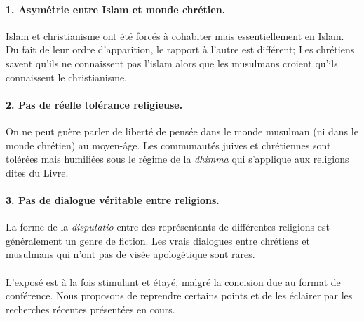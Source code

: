 \paragraph{1. Asymétrie entre Islam et monde chrétien.} Islam et christianisme ont été forcés à cohabiter mais essentiellement en Islam. Du fait de leur ordre d'apparition, le rapport à l'autre est différent; Les chrétiens savent qu'ils ne connaissent pas l'islam alors que les musulmans croient qu'ils connaissent le christianisme. \begin{comment}
    Les chrétiens sont curieux de l'Islam alors que le christianisme est pour l'islam une \textit{vieille histoire}, connue mais dépassée. 
\end{comment}


\paragraph{2. Pas de réelle tolérance religieuse.} On ne peut guère parler de liberté de pensée dans le monde musulman (ni dans le monde chrétien) au moyen-âge.  Les communautés juives et chrétiennes sont tolérées mais humiliées sous le régime de la \textit{dhimma} qui s'applique aux religions dites du Livre. 

\paragraph{3. Pas de dialogue véritable entre religions.} La forme de la \textit{disputatio} entre des représentants de différentes religions est généralement un genre de fiction. Les vrais dialogues entre chrétiens et musulmans qui n'ont pas de visée apologétique sont rares.

\paragraph{}
L'exposé est à la fois stimulant et étayé, malgré la concision due au format de conférence.  Nous proposons de reprendre certains points et de les éclairer par les recherches récentes présentées en cours. 
\begin{comment}
    trois points en lien avec le cours : partant du mythe de la \textit{convivencia} dans un Islam fragmenté, nous souhaitons souligner l'existence d'un dialogue au niveau de la culture, et à un niveau plus religieux, la transformation de la théologie chrétienne et musulmane au contact l'une de l'autre.
\end{comment}


